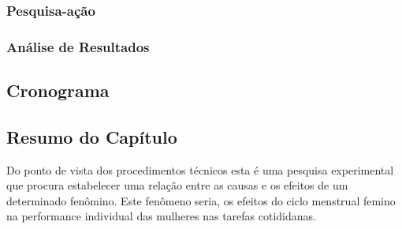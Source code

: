 \subsubsection{Pesquisa-ação}

\subsubsection{Análise de Resultados}

\subsection{Cronograma}

\subsection{Resumo do Capítulo}

          
Do ponto de vista dos procedimentos técnicos esta é uma pesquisa 
experimental que procura estabelecer uma relação entre as causas e os efeitos de um determinado fenômino. Este fenômeno seria, os efeitos do ciclo menstrual femino na performance individual das mulheres nas tarefas cotididanas.

